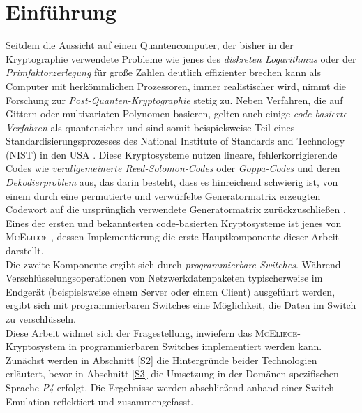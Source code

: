 \documentclass[utf8, biblatex]{lni}
\begin{document}
\section{Einführung}
Seitdem die Aussicht auf einen Quantencomputer, der bisher in der Kryptographie verwendete Probleme wie jenes des \textit{diskreten Logarithmus} oder der \textit{Primfaktorzerlegung} für große Zahlen deutlich effizienter brechen kann als Computer mit herkömmlichen Prozessoren, immer realistischer wird, nimmt die Forschung zur \textit{Post-Quanten-Kryptographie} stetig zu. Neben Verfahren, die auf Gittern oder multivariaten Polynomen basieren, gelten auch einige \textit{code-basierte Verfahren} als quantensicher und sind somit beispielsweise Teil eines Standardisierungsprozesses des National Institute of Standards and Technology (NIST) in den USA \cite{NISTPQC3}. Diese Kryptosysteme nutzen lineare, fehlerkorrigierende Codes wie \textit{verallgemeinerte Reed-Solomon-Codes} oder \textit{Goppa-Codes} und deren \textit{Dekodierproblem} aus, das darin besteht, dass es hinreichend schwierig ist, von einem durch eine permutierte und verwürfelte Generatormatrix erzeugten Codewort auf die ursprünglich verwendete Generatormatrix zurückzuschließen \cite{Berlekamp1978}. Eines der ersten und bekanntesten code-basierten Kryptosysteme ist jenes von \textsc{McEliece} \cite{McEliece1978}, dessen Implementierung die erste Hauptkomponente dieser Arbeit darstellt.\\
Die zweite Komponente ergibt sich durch \textit{programmierbare Switches}. Während Verschlüsselungsoperationen von Netzwerkdatenpaketen typischerweise im Endgerät (beispielsweise einem Server oder einem Client) ausgeführt werden, ergibt sich mit programmierbaren Switches eine Möglichkeit, die Daten im Switch zu verschlüsseln. \\Diese Arbeit widmet sich der Fragestellung, inwiefern das \textsc{McEliece}-Kryptosystem in programmierbaren Switches implementiert werden kann. Zunächst werden in Abschnitt \ref{S2} die Hintergründe beider Technologien erläutert, bevor in Abschnitt \ref{S3} die Umsetzung in der Domänen-spezifischen Sprache \textit{P4} erfolgt. Die Ergebnisse werden abschließend anhand einer Switch-Emulation reflektiert und zusammengefasst.
\printbibliography
\end{document}

